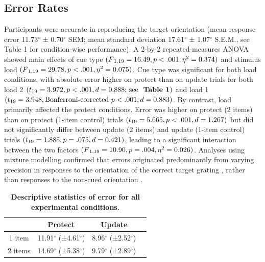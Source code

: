 \documentclass{article}
\begin{document}
\begin{large}
\subsection{Error Rates}
Participants were accurate in reproducing the target orientation (mean response error 11.73$^{\circ}$ ± 0.70$^{\circ}$ SEM; mean standard deviation 17.61$^{\circ}$ ± 1.07$^{\circ}$ S.E.M., see Table 1 for condition-wise performance). A 2-by-2 repeated-measures ANOVA showed main effects of cue type $(F\textsubscript{1,19} = 16.49, p < .001, \eta\textsuperscript{2} = 0.374)$ and stimulus load $(F\textsubscript{1,19} = 29.78, p < .001, \eta\textsuperscript{2} = 0.075)$. 
Cue type was significant for both load conditions, with absolute error higher on protect than on update trials for both load 2 $(t\textsubscript{19} = 3.972, p < .001, d = 0.888 \text{; see \textbf{ Table 1}})$ and load 1 $(t\textsubscript{19} = 3.948, \text{Bonferroni-corrected }  p < .001, d = 0.883)$. By contrast, load primarily affected the protect conditions. Error was higher on protect (2 items) than on protect (1-item control) trials $(t\textsubscript{19} = 5.665, p < .001, d = 1.267)$ but did not significantly differ between update (2 items) and update (1-item control) trials $(t\textsubscript{19} = 1.885, p = .075, d = 0.421)$, leading to a significant interaction between the two factors $(F\textsubscript{1,19} = 10.90, p = .004, \eta\textsuperscript{2} = 0.026)$.  Analyses using mixture modelling confirmed that errors originated predominantly from varying precision in responses to the orientation of the correct target grating \parencite{Bays2009}, rather than responses to the non-cued orientation \parencite[swap rate of .033 ± .01 on two-item trials; see also ][]{Huang2020}.

  
\bigskip

\begin{table}[htpb]

\begin{center}
\caption{\textbf{Descriptive statistics of error for all experimental conditions.}}

\begin{tabular}{cccc}

\toprule
& \textbf{Protect} & \textbf{Update} \\
\midrule
1 item & 11.91$^{\circ}$ (±4.61$^{\circ}$) & 8.96$^{\circ}$ (±2.52$^{\circ}$)  \\
2 items & 14.69$^{\circ}$ (±5.38$^{\circ}$) & 9.79$^{\circ}$ (±2.89$^{\circ}$)  \\
\bottomrule
\end{tabular}
\end{center}



\end{table}
\end{large}
\end{document}
